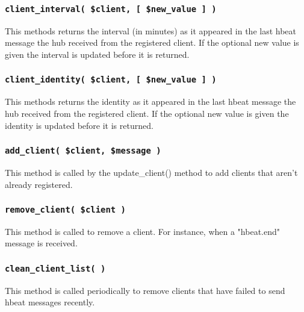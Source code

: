 \subsubsection*{\texttt{client\_interval( \$client, [ \$new\_value ] )}\label{xPL::Hub_client_interval_client_new_value_}}


This methods returns the interval (in minutes) as it appeared in the
last hbeat message the hub received from the registered client.  If
the optional new value is given the interval is updated before it is
returned.

\subsubsection*{\texttt{client\_identity( \$client, [ \$new\_value ] )}\label{xPL::Hub_client_identity_client_new_value_}}


This methods returns the identity as it appeared in the last hbeat
message the hub received from the registered client.  If the optional
new value is given the identity is updated before it is returned.

\subsubsection*{\texttt{add\_client( \$client, \$message )}\label{xPL::Hub_add_client_client_message_}}


This method is called by the \textsf{update\_client()} method to add clients
that aren't already registered.

\subsubsection*{\texttt{remove\_client( \$client )}\label{xPL::Hub_remove_client_client_}}


This method is called to remove a client.  For instance, when a "hbeat.end"
message is received.

\subsubsection*{\texttt{clean\_client\_list( )}\label{xPL::Hub_clean_client_list_}}


This method is called periodically to remove clients that have failed
to send hbeat messages recently.

